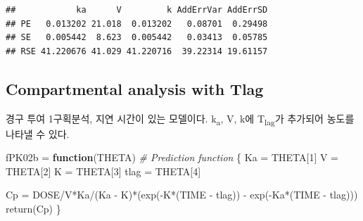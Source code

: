 \documentclass[
  11pt,
  krantz2, a4paper, twoside]{krantz}
\newenvironment{Shaded}{\begin{snugshade}}{\end{snugshade}}
\newcommand{\AttributeTok}[1]{\textcolor[rgb]{0.77,0.63,0.00}{#1}}
\newcommand{\CommentTok}[1]{\textcolor[rgb]{0.56,0.35,0.01}{\textit{#1}}}
\newcommand{\ControlFlowTok}[1]{\textcolor[rgb]{0.13,0.29,0.53}{\textbf{#1}}}
\newcommand{\DecValTok}[1]{\textcolor[rgb]{0.00,0.00,0.81}{#1}}
\newcommand{\FloatTok}[1]{\textcolor[rgb]{0.00,0.00,0.81}{#1}}
\newcommand{\FunctionTok}[1]{\textcolor[rgb]{0.00,0.00,0.00}{#1}}
\newcommand{\NormalTok}[1]{#1}
\newcommand{\OtherTok}[1]{\textcolor[rgb]{0.56,0.35,0.01}{#1}}
\newcommand{\SpecialCharTok}[1]{\textcolor[rgb]{0.00,0.00,0.00}{#1}}
\newcommand{\StringTok}[1]{\textcolor[rgb]{0.31,0.60,0.02}{#1}}
\theoremstyle{definition}
\theoremstyle{definition}
\theoremstyle{definition}
\theoremstyle{definition}
\theoremstyle{remark}
\begin{document}
\begin{verbatim}
##            ka      V         k AddErrVar AddErrSD
## PE   0.013202 21.018  0.013202   0.08701  0.29498
## SE   0.005442  8.623  0.005442   0.03413  0.05785
## RSE 41.220676 41.029 41.220716  39.22314 19.61157
\end{verbatim}

\hypertarget{compartmental-analysis-with-tlag}{%
\subsection{Compartmental analysis with Tlag}\label{compartmental-analysis-with-tlag}}

경구 투여 1구획분석, 지연 시간이 있는 모델이다. k\textsubscript{a}, V, k에 T\textsubscript{lag}가 추가되어 농도를 나타낼 수 있다.

\begin{Shaded}
\begin{Highlighting}[]
\NormalTok{fPK02b }\OtherTok{=} \ControlFlowTok{function}\NormalTok{(THETA) }\CommentTok{\# Prediction function}
\NormalTok{\{}
\NormalTok{  Ka   }\OtherTok{=}\NormalTok{ THETA[}\DecValTok{1}\NormalTok{]}
\NormalTok{  V    }\OtherTok{=}\NormalTok{ THETA[}\DecValTok{2}\NormalTok{]}
\NormalTok{  K    }\OtherTok{=}\NormalTok{ THETA[}\DecValTok{3}\NormalTok{]}
\NormalTok{  tlag }\OtherTok{=}\NormalTok{ THETA[}\DecValTok{4}\NormalTok{]}

\NormalTok{  Cp  }\OtherTok{=}\NormalTok{ DOSE}\SpecialCharTok{/}\NormalTok{V}\SpecialCharTok{*}\NormalTok{Ka}\SpecialCharTok{/}\NormalTok{(Ka }\SpecialCharTok{{-}}\NormalTok{ K)}\SpecialCharTok{*}\NormalTok{(}\FunctionTok{exp}\NormalTok{(}\SpecialCharTok{{-}}\NormalTok{K}\SpecialCharTok{*}\NormalTok{(TIME }\SpecialCharTok{{-}}\NormalTok{ tlag)) }\SpecialCharTok{{-}} \FunctionTok{exp}\NormalTok{(}\SpecialCharTok{{-}}\NormalTok{Ka}\SpecialCharTok{*}\NormalTok{(TIME }\SpecialCharTok{{-}}\NormalTok{ tlag))) }
  \FunctionTok{return}\NormalTok{(Cp)}
\NormalTok{\}}
\end{Highlighting}
\end{Shaded}

\begin{Shaded}
\end{Shaded}
\end{document}
